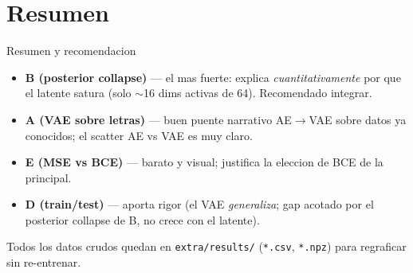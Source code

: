 \documentclass[aspectratio=169,10pt]{beamer}
\begin{document}
\section{Resumen}

\begin{frame}{Resumen y recomendacion}
  \begin{itemize}
    \item \textbf{B (posterior collapse)} --- el mas fuerte: explica
          \emph{cuantitativamente} por que el latente satura (solo $\sim$16
          dims activas de 64). \textcolor{green!50!black}{Recomendado integrar.}
    \item \textbf{A (VAE sobre letras)} --- buen puente narrativo AE$\to$VAE
          sobre datos ya conocidos; el scatter AE vs VAE es muy claro.
    \item \textbf{E (MSE vs BCE)} --- barato y visual; justifica la eleccion de
          BCE de la principal.
    \item \textbf{D (train/test)} --- aporta rigor (el VAE \emph{generaliza};
          gap acotado por el posterior collapse de B, no crece con el latente).
  \end{itemize}
  \vfill
  {\footnotesize Todos los datos crudos quedan en \texttt{extra/results/} (\texttt{*.csv},
   \texttt{*.npz}) para regraficar sin re-entrenar.}
\end{frame}
\end{document}
